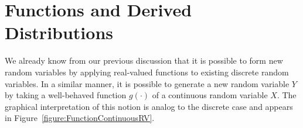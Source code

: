 \chapter{Functions and Derived Distributions}
\label{chapter:DerivedDistributions}

We already know from our previous discussion that it is possible to form new random variables by applying real-valued functions to existing discrete random variables.
In a similar manner, it is possible to generate a new random variable $Y$ by taking a well-behaved function $g(\cdot)$ of a continuous random variable $X$.
The graphical interpretation of this notion is analog to the discrete case and appears in Figure~\ref{figure:FunctionContinuousRV}.




